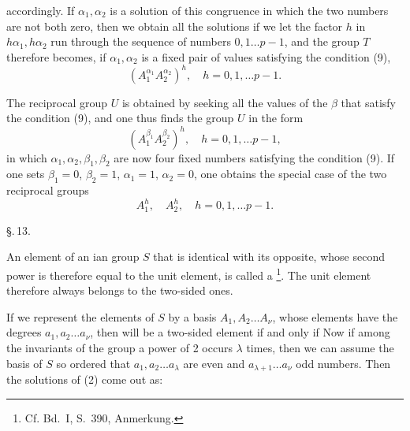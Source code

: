 accordingly. If $\alpha_1, \alpha_2$ is a solution of this
congruence in which the two numbers are not both zero, then we obtain
all the solutions if we let the factor $h$ in $h\alpha_1, h\alpha_2$
run through the sequence of numbers $0, 1 \dots p-1$, and the
group $T$ therefore becomes, if $\alpha_1, \alpha_2$ is a fixed
pair of values satisfying the condition (9),
\[
(A_1^{\alpha_1}A_2^{\alpha_2})^h, \quad h = 0, 1, \dots p-1.
\]

The reciprocal group $U$ is obtained by seeking all the values of
the $\beta$ that satisfy the condition (9), and one thus finds
the group $U$ in the form
\[
(A_1^{\beta_1}A_2^{\beta_2})^h, \quad h = 0, 1, \dots p-1,
\]
in which $\alpha_1, \alpha_2, \beta_1, \beta_2$ are now four fixed
numbers satisfying the condition (9). If one sets $\beta_1 = 0$,
$\beta_2 = 1$, $\alpha_1 = 1$, $\alpha_2 = 0$, one obtains the
special case of the two reciprocal groups
\[
A_1^h, \quad A_2^h, \quad h = 0, 1, \dots p-1.
\]

\begin{center}
\S.\,13.

\end{center}

An element of an ian group $S$ that is identical with its
opposite, whose second power is therefore equal to the unit
element, is called a \footnote{Cf. Bd.~I, S.~390, Anmerkung.}. The unit
element therefore always belongs to the two-sided ones.

If we represent the elements of $S$ by a basis
$A_1, A_2 \dots A_\nu$, whose elements have the degrees
$a_1, a_2 \dots a_\nu$, then
will be a two-sided element if and only if
Now if among the invariants of the group a power of 2 occurs
$\lambda$ times, then we can assume the basis of $S$ so
ordered that $a_1, a_2 \dots a_\lambda$ are even and
$a_{\lambda+1} \dots a_\nu$ odd numbers. Then the solutions
of (2) come out as:
